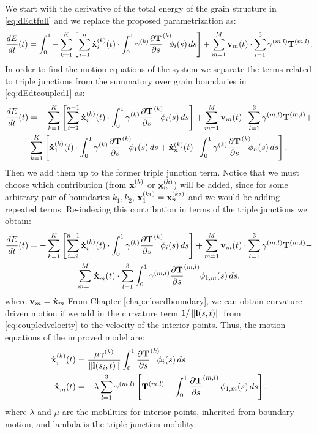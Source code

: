 We start with the derivative of the total energy of the grain structure in \eqref{eq:dEdtfull} and we replace the proposed parametrization as:
\begin{equation}
    \frac{dE}{dt}(t) = \int_0^1 -\sum_{k=1}^{K}\left[ \sum_{i=1}^{n} \dotx[i][k](t)  \cdot \int_0^1  \gamma^{(k)}\dTds^{(k)}\!\! \phi_i(s)\,ds \right] + \sum_{m=1}^{M} \vel_m(t) \cdot \sum_{l=1}^3 \gamma^{(m,l)}\T^{(m,l)}.
    \label{eq:dEdtcoupled1}
\end{equation}
In order to find the motion equations of the system we separate the terms related to triple junctions from the summatory over grain boundaries in \eqref{eq:dEdtcoupled1} as:
\begin{multline*}
    \frac{dE}{dt}(t) =  -\sum_{k=1}^{K}\left[ \sum_{i=2}^{n-1} \dotx[i][k](t)  \cdot \int_0^1  \gamma^{(k)}\dTds^{(k)}\!\! \phi_i(s)\,ds \right] + \sum_{m=1}^{M} \vel_m(t) \cdot \sum_{l=1}^3 \gamma^{(m,l)}\T^{(m,l)} + \\ \sum_{k=1}^K \left[\dotx[1][k](t)\cdot\int_0^1 \gamma^{(k)} \dTds^{(k)}\!\! \phi_1(s)\,ds + \dotx[n][k](t)\cdot\int_0^1 \gamma^{(k)} \dTds^{(k)}\!\! \phi_n(s)\,ds\right].
\end{multline*}
Then we add them up to the former triple junction term. Notice that we must choose which contribution (from $\x[1][k]$ or $\x[n][k]$) will be added, since for some arbitrary pair of boundaries $k_1, k_2$, $\x[1][k_1] = \x[n][k_2]$ and we would be adding repeated terms. Re-indexing this contribution in terms of the triple junctions we obtain:
\begin{multline}
    \frac{dE}{dt}(t) =   -\sum_{k=1}^{K}\left[ \sum_{i=2}^{n-1} \dotx[i][k](t)  \cdot \int_0^1  \gamma^{(k)}\dTds^{(k)}\!\! \phi_i(s)\,ds \right] + \sum_{m=1}^{M} \vel_m(t) \cdot \sum_{l=1}^3 \gamma^{(m,l)}\T^{(m,l)} - \\ \sum_{m=1}^{M} \dotx[m]\,\,(t) \cdot \sum_{l=1}^3 \int_0^1 \gamma^{(m,l)} \dTds^{(m,l)}\phi_{1,m}(s)\,ds.
    \label{eq:dEdtcoupled3}
\end{multline}
where $\vel_m = \dotx[m]$. From Chapter \ref{chap:closedboundary}, we can obtain curvature driven motion if we add in the curvature term $1/\left\lVert\mathbf{l}(s,t)\right\rVert$ from \eqref{eq:coupledvelocity} to the velocity of the interior points. Thus, the motion equations of the improved model are:
\begin{align}
    \dotx[i][k](t) &= \frac{\mu\gamma^{(k)}}{\norm{\mylvec(s_i,t)}} \int_0^1 \dTds^{(k)}\!\!\phi_i(s)\,ds \\
    \dotx[m]\,\,(t) &= -\lambda\sum_{l=1}^{3}\gamma^{(m,l)} \left[\T^{(m,l)} - \int_0^1 \dTds^{(m,l)}\,\phi_{1,m}(s)\,ds \right],
\end{align}
where $\lambda$ and $\mu$ are the mobilities for interior points, inherited from boundary motion, and lambda is the triple junction mobility.
